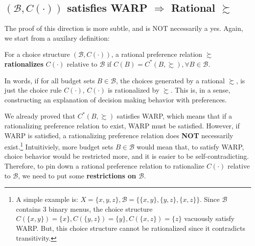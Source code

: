 \subsection*{$(\mathcal{B},C(\cdot))$ satisfies WARP $\Rightarrow$ Rational $\succsim$}
The proof of this direction is more subtle, and is NOT necessarily a yes. Again, we start from a auxilary definition:
\begin{definition}\label{def_rationalize_choice}
    For a choice structure $(\mathcal{B},C(\cdot))$, a rational preference relation $\succsim$ \textbf{rationalizes} $C(\cdot)$ relative to $\mathcal{B}$ if $C(B)=C^*(B,\succsim), \forall B\in\mathcal{B}$.
\end{definition}

In words, if for all budget sets $B\in\mathcal{B}$, the choices generated by a rational $\succsim$, is just the choice rule $C(\cdot)$, $C(\cdot)$ is rationalized by $\succsim$. This is, in a sense, constructing an explanation of decision making behavior with preferences.

We already proved that $C^*(B,\succsim)$ satisfies WARP, which means that if a rationalizing preference relation to exist, WARP must be satisfied. However, if WARP is satisfied, a rationalizing preference relation does \textbf{NOT} necessarily exist.\footnote{A simple example is: $X=\{x,y,z\},\mathcal{B}=\{\{x,y\},\{y,z\},\{x,z\}\}$. Since $\mathcal{B}$ contains 3 binary menus, the choice structure $C(\{x,y\})=\{x\},C(\{y,z\})=\{y\},C(\{x,z\})=\{z\}$ vacuously satisfy WARP. But, this choice structure cannot be rationalized since it contradicts transitivity.}
Intuitiviely, more budget sets $B\in\mathcal{B}$ would mean that, to satisfy WARP, choice behavior would be restricted more, and it is easier to be self-contradicting. Therefore, to pin down a rational preference relation to rationalize $C(\cdot)$ relative to $\mathcal{B}$, we need to put some \textbf{restrictions on $\mathcal{B}$}.

